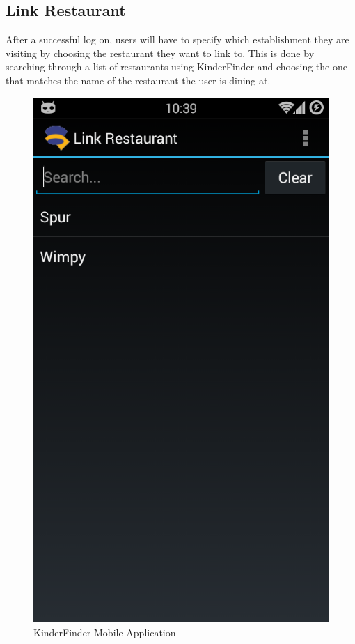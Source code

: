 \documentclass{article}
\begin{document}
\subsection{Link Restaurant}
After a successful log on, users will have to specify which establishment they are visiting by choosing the restaurant they want to link to. This is done by searching through a list of restaurants using KinderFinder and choosing the one that matches the name of the restaurant the user is dining at.
\begin{figure}[H]
\centering
\includegraphics[scale=0.4]{Main App - Link Restaurant.png}
\caption{KinderFinder Mobile Application}
\end{figure}
\end{document}
